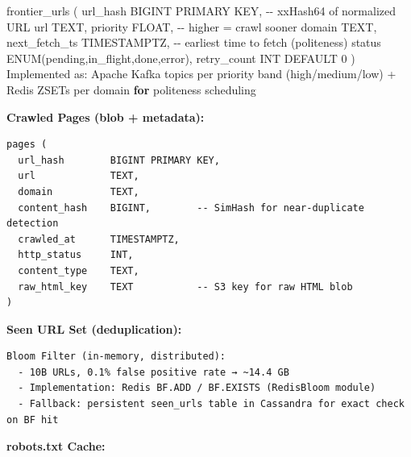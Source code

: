 \documentclass[11pt]{article}
\newenvironment{Shaded}{\begin{snugshade}}{\end{snugshade}}
\newcommand{\ControlFlowTok}[1]{\textcolor[rgb]{0.99,0.74,0.29}{\textbf{#1}}}
\newcommand{\DecValTok}[1]{\textcolor[rgb]{0.96,0.45,0.00}{#1}}
\newcommand{\ImportTok}[1]{\textcolor[rgb]{0.15,0.68,0.38}{#1}}
\newcommand{\NormalTok}[1]{\textcolor[rgb]{0.81,0.81,0.76}{#1}}
\newcommand{\OperatorTok}[1]{\textcolor[rgb]{0.81,0.81,0.76}{#1}}
\newcommand{\StringTok}[1]{\textcolor[rgb]{0.96,0.31,0.31}{#1}}
\begin{document}
\begin{Shaded}
\begin{Highlighting}[]
\NormalTok{frontier\_urls (}
\NormalTok{  url\_hash        BIGINT  PRIMARY KEY,    }\OperatorTok{{-}{-}}\NormalTok{ xxHash64 of normalized URL}
\NormalTok{  url             TEXT,}
\NormalTok{  priority        FLOAT,                  }\OperatorTok{{-}{-}}\NormalTok{ higher }\OperatorTok{=}\NormalTok{ crawl sooner}
\NormalTok{  domain          TEXT,}
\NormalTok{  next\_fetch\_ts   TIMESTAMPTZ,            }\OperatorTok{{-}{-}}\NormalTok{ earliest time to fetch (politeness)}
\NormalTok{  status          ENUM(}\StringTok{\textquotesingle{}pending\textquotesingle{}}\NormalTok{,}\StringTok{\textquotesingle{}in\_flight\textquotesingle{}}\NormalTok{,}\StringTok{\textquotesingle{}done\textquotesingle{}}\NormalTok{,}\StringTok{\textquotesingle{}error\textquotesingle{}}\NormalTok{),}
\NormalTok{  retry\_count     INT DEFAULT }\DecValTok{0}
\NormalTok{)}
\NormalTok{Implemented }\ImportTok{as}\NormalTok{: Apache Kafka topics per priority band (high}\OperatorTok{/}\NormalTok{medium}\OperatorTok{/}\NormalTok{low)}
                \OperatorTok{+}\NormalTok{ Redis ZSETs per domain }\ControlFlowTok{for}\NormalTok{ politeness scheduling}
\end{Highlighting}
\end{Shaded}

\textbf{Crawled Pages (blob + metadata):}

\setcodelang{}

\begin{verbatim}
pages (
  url_hash        BIGINT PRIMARY KEY,
  url             TEXT,
  domain          TEXT,
  content_hash    BIGINT,        -- SimHash for near-duplicate detection
  crawled_at      TIMESTAMPTZ,
  http_status     INT,
  content_type    TEXT,
  raw_html_key    TEXT           -- S3 key for raw HTML blob
)
\end{verbatim}

\textbf{Seen URL Set (deduplication):}

\setcodelang{}

\begin{verbatim}
Bloom Filter (in-memory, distributed):
  - 10B URLs, 0.1% false positive rate → ~14.4 GB
  - Implementation: Redis BF.ADD / BF.EXISTS (RedisBloom module)
  - Fallback: persistent seen_urls table in Cassandra for exact check on BF hit
\end{verbatim}

\textbf{robots.txt Cache:}

\setcodelang{}
\end{document}
